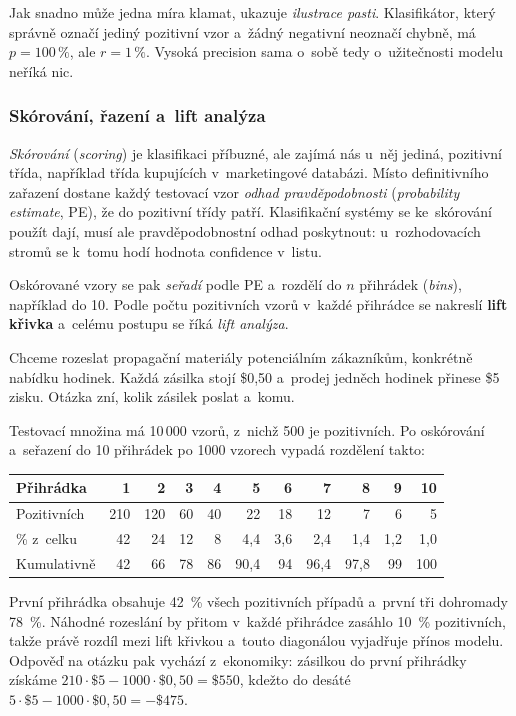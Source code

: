 \documentclass[11pt,a4paper]{article}
\theoremstyle{definition}
\begin{document}
Jak snadno může jedna míra klamat, ukazuje \emph{ilustrace pasti}. Klasifikátor, který správně
označí jediný pozitivní vzor a~žádný negativní neoznačí chybně, má $p=100\,\%$, ale $r=1\,\%$.
Vysoká precision sama o~sobě tedy o~užitečnosti modelu neříká nic.

\subsubsection{Skórování, řazení a~lift analýza}

\emph{Skórování} (\emph{scoring}) je klasifikaci příbuzné, ale zajímá nás u~něj jediná,
pozitivní třída, například třída kupujících v~marketingové databázi. Místo definitivního
zařazení dostane každý testovací vzor \emph{odhad pravděpodobnosti} (\emph{probability
estimate}, PE), že do pozitivní třídy patří. Klasifikační systémy se ke~skórování použít dají,
musí ale pravděpodobnostní odhad poskytnout: u~rozhodovacích stromů se k~tomu hodí hodnota
confidence v~listu.

Oskórované vzory se pak \emph{seřadí} podle PE a~rozdělí do $n$ přihrádek (\emph{bins}),
například do 10. Podle počtu pozitivních vzorů v~každé přihrádce se nakreslí \textbf{lift
křivka} a~celému postupu se říká \emph{lift analýza}.

\begin{defbox}
Chceme rozeslat propagační materiály potenciálním zákazníkům, konkrétně nabídku hodinek. Každá
zásilka stojí \$0,50 a~prodej jedněch hodinek přinese \$5 zisku. Otázka zní, kolik zásilek
poslat a~komu.

Testovací množina má 10\,000 vzorů, z~nichž 500 je pozitivních. Po oskórování a~seřazení do
10 přihrádek po 1000 vzorech vypadá rozdělení takto:

\begin{center}
\small
\begin{tabular}{@{}lrrrrrrrrrr@{}}
\toprule
Přihrádka & 1 & 2 & 3 & 4 & 5 & 6 & 7 & 8 & 9 & 10 \\
\midrule
Pozitivních & 210 & 120 & 60 & 40 & 22 & 18 & 12 & 7 & 6 & 5 \\
\% z~celku & 42 & 24 & 12 & 8 & 4,4 & 3,6 & 2,4 & 1,4 & 1,2 & 1,0 \\
Kumulativně & 42 & 66 & 78 & 86 & 90,4 & 94 & 96,4 & 97,8 & 99 & 100 \\
\bottomrule
\end{tabular}
\end{center}

První přihrádka obsahuje 42~\% všech pozitivních případů a~první tři dohromady 78~\%. Náhodné
rozeslání by přitom v~každé přihrádce zasáhlo 10~\% pozitivních, takže právě rozdíl mezi lift
křivkou a~touto diagonálou vyjadřuje přínos modelu. Odpověď na otázku  pak
vychází z~ekonomiky: zásilkou do první přihrádky získáme
$210\cdot\$5-1000\cdot\$0{,}50=\$550$, kdežto do desáté
$5\cdot\$5-1000\cdot\$0{,}50=-\$475$.
\end{defbox}
\end{document}

